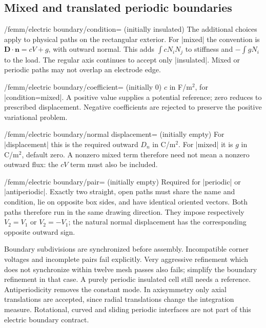 \subsection{Mixed and translated periodic boundaries}
\begin{key}{/femm/electric boundary/condition= (initially insulated)}
The additional choices apply to physical paths on the rectangular exterior.
For |mixed| the convention is $\mathbf D\cdot\mathbf n=cV+g$, with outward
normal. This adds $\int cN_iN_j$ to stiffness and $-\int gN_i$ to the load.
The regular axis continues to accept only |insulated|. Mixed or periodic paths
may not overlap an electrode edge.
\end{key}
\begin{key}{/femm/electric boundary/coefficient= (initially 0)}
$c$ in F/m$^2$, for |condition=mixed|. A positive value supplies a potential
reference; zero reduces to prescribed displacement. Negative coefficients
are rejected to preserve the positive variational problem.
\end{key}
\begin{key}{/femm/electric boundary/normal displacement= (initially empty)}
For |displacement| this is the required outward $D_n$ in C/m$^2$.
For |mixed| it is $g$ in C/m$^2$, default zero. A nonzero mixed term therefore
need not mean a nonzero outward flux: the $cV$ term must also be included.
\end{key}
\begin{key}{/femm/electric boundary/pair= (initially empty)}
Required for |periodic| or |antiperiodic|. Exactly two straight, open paths
must share the name and condition, lie on opposite box sides, and have
identical oriented vectors. Both paths therefore run in the same drawing
direction. They impose respectively $V_2=V_1$ or $V_2=-V_1$; the natural
normal displacement has the corresponding opposite outward sign.

Boundary subdivisions are synchronized before assembly. Incompatible corner
voltages and incomplete pairs fail explicitly. Very aggressive refinement
which does not synchronize within twelve mesh passes also fails; simplify the
boundary refinement in that case. A purely periodic insulated cell still
needs a reference. Antiperiodicity removes the constant mode. In axisymmetry
only axial translations are accepted, since radial translations change the
integration measure. Rotational, curved and sliding periodic interfaces are
not part of this electric boundary contract.
\end{key}
